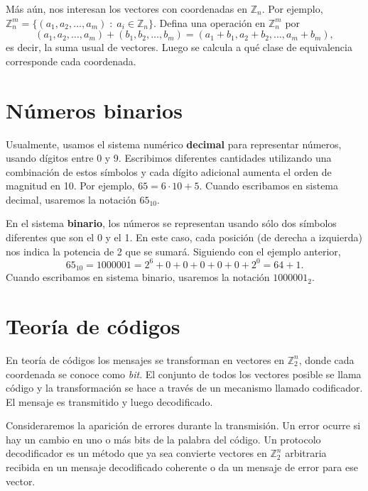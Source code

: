 \documentclass[a4paper]{article}
\newcommand{\Z}{\mathbb{Z}}
\begin{document}
M\'as a\'un, nos interesan los vectores con coordenadas en $\mathbb{Z}_n$. Por ejemplo, $\mathbb{Z}^m_n=\{(a_1,a_2,\dots,a_m)\;:\; a_i \in \mathbb{Z}_n\}$. Defina una operación en $\mathbb{Z}^m_n$ por
\[(a_1,a_2,\dots,a_m)+(b_1,b_2,\dots,b_m)=(a_1+b_1,a_2+b_2,\dots,a_m+b_m),\]
es decir, la suma usual de vectores. Luego se calcula a qu\'e clase de equivalencia corresponde cada coordenada.


\section*{N\'umeros binarios}
\vspace{0.2 cm}

Usualmente, usamos el sistema numérico \textbf{decimal} para representar n\'umeros, usando dígitos entre 0 y 9. Escribimos diferentes cantidades utilizando una combinación de estos símbolos y cada d\'igito adicional aumenta el orden de magnitud en 10. Por ejemplo, $65=6\cdot 10+5$. Cuando escribamos en sistema decimal, usaremos la notaci\'on $65_{10}$.

En el sistema \textbf{binario}, los números se representan usando s\'olo dos símbolos diferentes que son el 0 y el 1. En este caso, cada posici\'on (de derecha a izquierda) nos indica la potencia de 2 que se sumar\'a. Siguiendo con el ejemplo anterior, \[65_{10}=1000001=2^6+0+0+0+0+0+2^0=64+1.\] Cuando escribamos en sistema binario, usaremos la notaci\'on $1000001_{2}$.
\begin{itemize}

\end{itemize}

\section*{Teor\'ia de c\'odigos}
\vspace{0.2 cm}
En teor\'ia de c\'odigos los mensajes se transforman en vectores en $\Z_2^n$, donde cada coordenada se conoce como \emph{bit}.  El conjunto de todos los vectores posible se llama código y la transformaci\'on se hace a través de un mecanismo llamado codificador. El mensaje es transmitido y luego decodificado. 

Consideraremos la aparición de errores durante la transmisión. Un error ocurre si hay un cambio en uno o más bits de la palabra del código. Un protocolo decodificador es un método que ya sea convierte 
vectores en $\Z_2^n$ arbitraria recibida en un mensaje decodificado coherente o da un mensaje de error para ese vector. 
\end{document}
